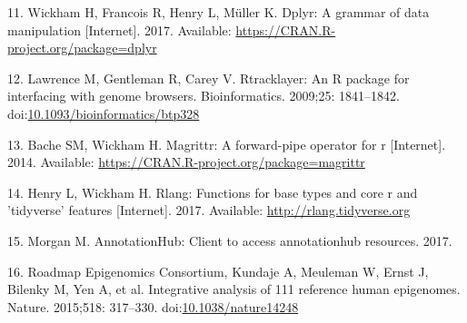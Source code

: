 \documentclass[10pt,letterpaper]{article}
\begin{document}
\hypertarget{ref-Wickham2017-dplyr}{}
11. Wickham H, Francois R, Henry L, Müller K. Dplyr: A grammar of data
manipulation {[}Internet{]}. 2017. Available:
\url{https://CRAN.R-project.org/package=dplyr}

\hypertarget{ref-Lawrence2009-nt}{}
12. Lawrence M, Gentleman R, Carey V. Rtracklayer: An R package for
interfacing with genome browsers. Bioinformatics. 2009;25: 1841--1842.
doi:\href{https://doi.org/10.1093/bioinformatics/btp328}{10.1093/bioinformatics/btp328}

\hypertarget{ref-R-magrittr}{}
13. Bache SM, Wickham H. Magrittr: A forward-pipe operator for r
{[}Internet{]}. 2014. Available:
\url{https://CRAN.R-project.org/package=magrittr}

\hypertarget{ref-R-rlang}{}
14. Henry L, Wickham H. Rlang: Functions for base types and core r and
'tidyverse' features {[}Internet{]}. 2017. Available:
\url{http://rlang.tidyverse.org}

\hypertarget{ref-R-ahub}{}
15. Morgan M. AnnotationHub: Client to access annotationhub resources.
2017.

\hypertarget{ref-Roadmap_Epigenomics_Consortium2015-pr}{}
16. Roadmap Epigenomics Consortium, Kundaje A, Meuleman W, Ernst J,
Bilenky M, Yen A, et al. Integrative analysis of 111 reference human
epigenomes. Nature. 2015;518: 317--330.
doi:\href{https://doi.org/10.1038/nature14248}{10.1038/nature14248}

\nolinenumbers
\end{document}
